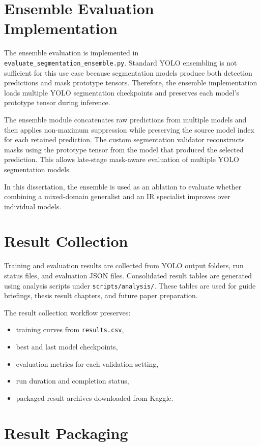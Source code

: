\section{Ensemble Evaluation Implementation}

The ensemble evaluation is implemented in \texttt{evaluate\_segmentation\_ensemble.py}. Standard YOLO ensembling is not sufficient for this use case because segmentation models produce both detection predictions and mask prototype tensors. Therefore, the ensemble implementation loads multiple YOLO segmentation checkpoints and preserves each model's prototype tensor during inference.

The ensemble module concatenates raw predictions from multiple models and then applies non-maximum suppression while preserving the source model index for each retained prediction. The custom segmentation validator reconstructs masks using the prototype tensor from the model that produced the selected prediction. This allows late-stage mask-aware evaluation of multiple YOLO segmentation models.

In this dissertation, the ensemble is used as an ablation to evaluate whether combining a mixed-domain generalist and an IR specialist improves over individual models.

\section{Result Collection}

Training and evaluation results are collected from YOLO output folders, run status files, and evaluation JSON files. Consolidated result tables are generated using analysis scripts under \texttt{scripts/analysis/}. These tables are used for guide briefings, thesis result chapters, and future paper preparation.

The result collection workflow preserves:

\begin{itemize}
    \item training curves from \texttt{results.csv},
    \item best and last model checkpoints,
    \item evaluation metrics for each validation setting,
    \item run duration and completion status,
    \item packaged result archives downloaded from Kaggle.
\end{itemize}

\section{Result Packaging}

